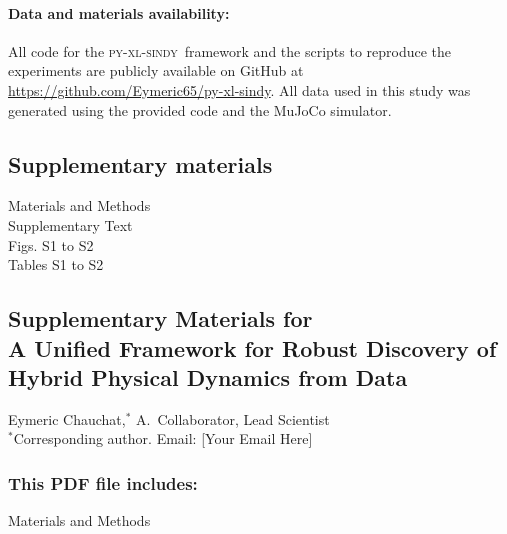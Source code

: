 \documentclass[12pt]{article}
\newcommand{\frameworkname}{\textsc{py-xl-sindy}}
\def\scititle{
	A Unified Framework for Robust Discovery of Hybrid Physical Dynamics from Data
}
\begin{document}
\paragraph*{Data and materials availability:}
All code for the \frameworkname\ framework and the scripts to reproduce the experiments are publicly available on GitHub at \url{https://github.com/Eymeric65/py-xl-sindy}. All data used in this study was generated using the provided code and the MuJoCo simulator.


\subsection*{Supplementary materials}
Materials and Methods\\
Supplementary Text\\
Figs. S1 to S2\\
Tables S1 to S2\\



\newpage
\appendix

\renewcommand{\thefigure}{S\arabic{figure}}
\renewcommand{\thetable}{S\arabic{table}}
\renewcommand{\theequation}{S\arabic{equation}}
\renewcommand{\thepage}{S\arabic{page}}
\setcounter{figure}{0}
\setcounter{table}{0}
\setcounter{equation}{0}
\setcounter{page}{1}


\begin{center}
\section*{Supplementary Materials for\\ \scititle}
Eymeric Chauchat,$^{\ast}$ A.~Collaborator, Lead Scientist\\
\small$^\ast$Corresponding author. Email: [Your Email Here]
\end{center}

\subsubsection*{This PDF file includes:}
Materials and Methods

\newpage

\end{document}
